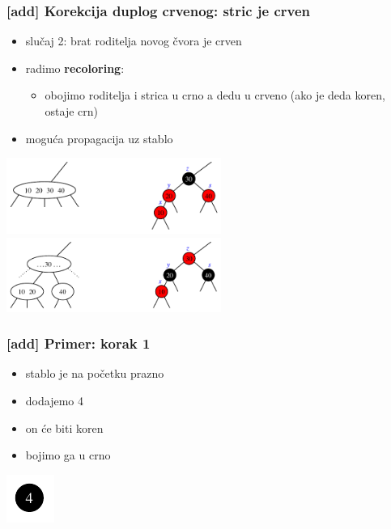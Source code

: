 \documentclass[compress,aspectratio=169]{beamer}
\begin{document}
\begin{frame}[fragile]
  \frametitle{[add] Korekcija duplog crvenog: stric je crven}
  \begin{itemize}
    \item slučaj 2: brat roditelja novog čvora je crven
    \item radimo \textbf{recoloring}:
    \begin{itemize}
      \item obojimo roditelja i strica u crno a dedu u crveno (ako je deda koren, ostaje crn)
    \end{itemize}
    \item moguća propagacija uz stablo
  \end{itemize}
  \includegraphics[width=7cm]{asp-11-pic40a.pdf} \\
  \includegraphics[width=7cm]{asp-11-pic40b.pdf}
\end{frame}

\begin{frame}[fragile]
  \frametitle{[add] Primer: korak 1}
  \begin{itemize}
    \item stablo je na početku prazno
    \item dodajemo 4
    \item on će biti koren
    \item bojimo ga u crno
  \end{itemize}
  \begin{center}
    \includegraphics[scale=1.0]{asp-11-add-01.pdf}
  \end{center}
\end{frame}
\end{document}
